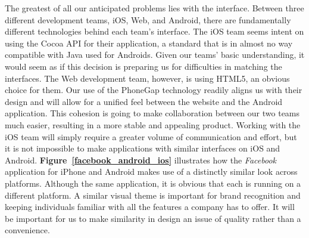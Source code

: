 \documentclass[12pt]{article}
\begin{document}
The greatest of all our anticipated problems lies with the interface.  Between three different development teams, iOS, Web, and Android, there are fundamentally different technologies behind each team's interface.  The iOS team seems intent on using the Cocoa API for their application, a standard that is in almost no way compatible with Java used for Androids.  Given our teams' basic understanding, it would seem as if this decision is preparing us for difficulties in matching the interfaces.  The Web development team, however, is using HTML5, an obvious choice for them.  Our use of the PhoneGap technology readily aligns us with their design and will allow for a unified feel between the website and the Android application.  This cohesion is going to make collaboration between our two teams much easier, resulting in a more stable and appealing product.  Working with the iOS team will simply require a greater volume of communication and effort, but it is not impossible to make applications with similar interfaces on iOS and Android.  \textbf{Figure~\ref{facebook_android_ios}} illustrates how the \textit{Facebook} application for iPhone and Android makes use of a distinctly similar look across platforms.  Although the same application, it is obvious that each is running on a different platform.  A similar visual theme is important for brand recognition and keeping individuals familiar with all the features a company has to offer.  It will be important for us to make similarity in design an issue of quality rather than a convenience.
\end{document}
